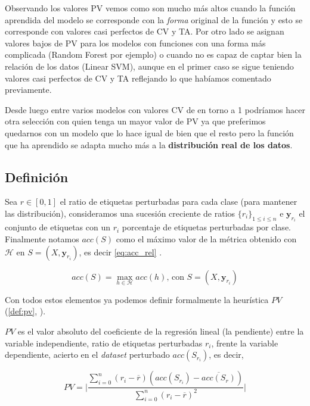 Observando los valores PV vemos como son mucho más altos cuando la función aprendida del modelo se corresponde con la \emph{forma} original de la función y esto se corresponde con valores casi perfectos de CV y TA. Por otro lado se asignan valores bajos de PV para los modelos con funciones con una forma más complicada (Random Forest por ejemplo) o cuando no es capaz de captar bien la relación de los datos (Linear SVM), aunque en el primer caso se sigue teniendo valores casi perfectos de CV y TA reflejando lo que habíamos comentado previamente.

Desde luego entre varios modelos con valores CV de en torno a 1 podríamos hacer otra selección con quien tenga un mayor valor de PV ya que preferimos quedarnos con un modelo que lo hace igual de bien que el resto pero la función que ha aprendido se adapta mucho más a la \textbf{distribución real de los datos}.

\subsection{Definición}

Sea $r \in [0, 1]$ el ratio de etiquetas perturbadas para cada clase (para mantener las distribución), consideramos una sucesión creciente de ratios $\{r_i\}_{1 \leq i \leq n}$ e $\textbf{y}_{r_i}$ el conjunto de etiquetas con un $r_i$ porcentaje de etiquetas perturbadas por clase. Finalmente notamos $acc(S)$ como el máximo valor de la métrica obtenido con $\mathcal{H}$ en $S = (X, \textbf{y}_{r_i})$, es decir \eqref{eq:acc_rel} \cite{zhang2019perturbation}.

\begin{equation}
  acc(S) = \max_{h \in \mathcal{H}} acc(h) \text{, con } S = (X, \textbf{y}_{r_i})
  \label{eq:acc_rel}
\end{equation}

Con todos estos elementos ya podemos definir formalmente la heurística $PV$ (\autoref{def:pv}, \cite{zhang2019perturbation}).

\begin{definicion}\label{def:pv}
  $PV$ es el valor absoluto del coeficiente de la regresión lineal (la pendiente) entre la variable independiente, ratio de etiquetas perturbadas $r_i$, frente la variable dependiente, acierto en el \emph{dataset} perturbado $acc(S_{r_i})$, es decir,

  $$PV = \Bigg|\dfrac{\sum \limits^n_{i = 0} (r_i - \overline{r})(acc(S_{r_{i}}) - \overline{acc(S_r)})}{\sum \limits^n_{i = 0}(r_i - \overline{r})^2}\Bigg|$$
\end{definicion}

